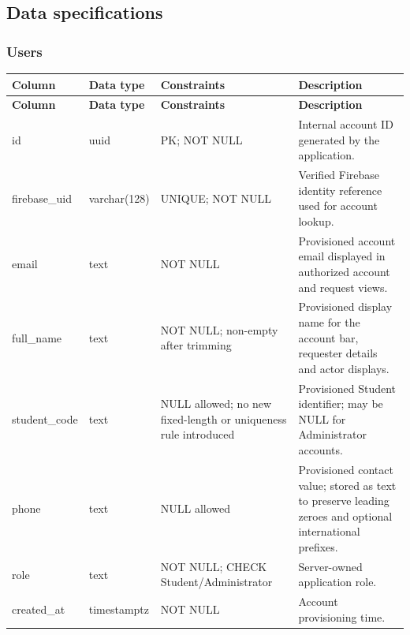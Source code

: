 \subsection{Data specifications}

\subsubsection{Users}

\begin{longtable}{|p{}|p{}|p{}|p{}|}

\hline

\textbf{Column} & \textbf{Data type} & \textbf{Constraints} & \textbf{Description} \\ \hline

\endfirsthead

\hline

\textbf{Column} & \textbf{Data type} & \textbf{Constraints} & \textbf{Description} \\ \hline

\endhead

id & uuid & PK; NOT NULL & Internal account ID generated by the application. \\ \hline

firebase\allowbreak\_\allowbreak{}uid & varchar(128) & UNIQUE; NOT NULL & Verified Firebase identity reference used for account lookup. \\ \hline

email & text & NOT NULL & Provisioned account email displayed in authorized account and request views. \\ \hline

full\allowbreak\_\allowbreak{}name & text & NOT NULL; non-empty after trimming & Provisioned display name for the account bar, requester details and actor displays. \\ \hline

student\allowbreak\_\allowbreak{}code & text & NULL allowed; no new fixed-length or uniqueness rule introduced & Provisioned Student identifier; may be NULL for Administrator accounts. \\ \hline

phone & text & NULL allowed & Provisioned contact value; stored as text to preserve leading zeroes and optional international prefixes. \\ \hline

role & text & NOT NULL; CHECK Student/\allowbreak{}Administrator & Server-owned application role. \\ \hline

created\allowbreak\_\allowbreak{}at & timestamptz & NOT NULL & Account provisioning time. \\ \hline

\end{longtable}

